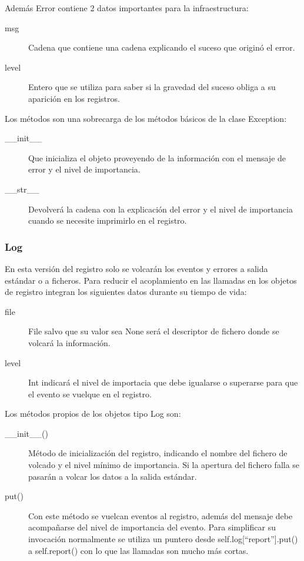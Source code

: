 \documentclass[a4paper,spanish,12pt]{book}
\begin{document}
Además Error contiene 2 datos importantes para la infraestructura:
\begin{description}
	\item[msg]Cadena que contiene una cadena explicando el suceso que originó el error.
	\item[level]Entero que se utiliza para saber si la gravedad del suceso obliga a su aparición en los registros.
\end{description}
Los m\'etodos son una sobrecarga de los m\'etodos básicos de la clase Exception:
\begin{description}
	\item[\_\_init\_\_]Que inicializa el objeto proveyendo de la información con el mensaje de error y el nivel de importancia.
	\item[\_\_str\_\_]Devolverá la cadena con la explicación del error y el nivel de importancia cuando se necesite imprimirlo en el registro.
\end{description}
\subsubsection{Log}
En esta versión del registro solo se volcarán los eventos y errores a salida estándar o a ficheros. Para reducir el acoplamiento en las llamadas en los objetos de registro integran los siguientes datos durante su tiempo de vida:
\begin{description}
	\item[file]File salvo que su valor sea None será el descriptor de fichero donde se volcará la información.
	\item[level]Int indicará el nivel de importacia que debe igualarse o superarse para que el evento se vuelque en el registro.
\end{description}
Los m\'etodos propios de los objetos tipo Log son:
\begin{description}
	\item[\_\_init\_\_()]M\'etodo de inicialización del registro, indicando el nombre del fichero de volcado y el nivel mínimo de importancia. Si la apertura del fichero falla se pasarán a volcar los datos a la salida estándar.
	\item[put()]Con este m\'etodo se vuelcan eventos al registro, además del mensaje debe acompañarse del nivel de importancia del evento. Para simplificar su invocación normalmente se utiliza un puntero desde self.log[``report''].put() a self.report() con lo que las llamadas son mucho más cortas.
\end{description}
\end{document}
